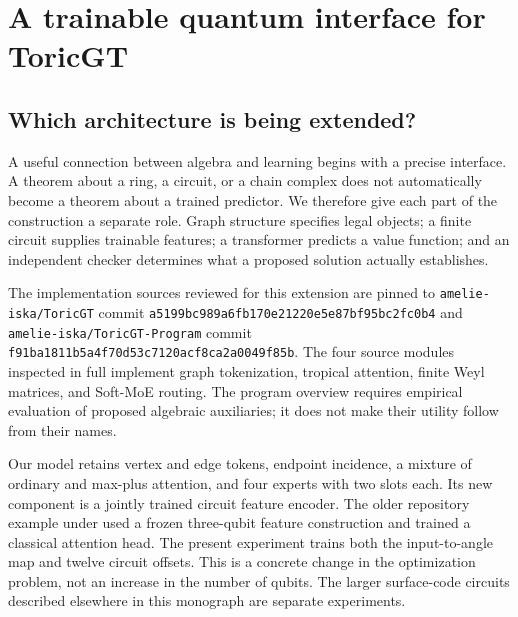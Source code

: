 \chapter{A trainable quantum interface for ToricGT}
\label{chap:quantum-toricgt}


\section{Which architecture is being extended?}

A useful connection between algebra and learning begins with a precise
interface. A theorem about a ring, a circuit, or a chain complex does not
automatically become a theorem about a trained predictor. We therefore give
each part of the construction a separate role. Graph structure specifies
legal objects; a finite circuit supplies trainable features; a transformer
predicts a value function; and an independent checker determines what a
proposed solution actually establishes.

The implementation sources reviewed for this extension are pinned to
\texttt{amelie-iska/ToricGT} commit
\texttt{a5199bc989a6fb170e21220e5e87bf95bc2fc0b4} and
\texttt{amelie-iska/ToricGT-Program} commit
\texttt{f91ba1811b5a4f70d53c7120acf8ca2a0049f85b}.
The four source modules inspected in full implement graph tokenization,
tropical attention, finite Weyl matrices, and Soft-MoE routing. The program
overview requires empirical evaluation of proposed algebraic auxiliaries;
it does not make their utility follow from their names.
\cite{qtToricGTCode,qtToricGTProgram}

Our model retains vertex and edge tokens, endpoint incidence, a mixture of
ordinary and max-plus attention, and four experts with two slots each.
Its new component is a jointly trained circuit feature encoder. The older
repository example under  used a frozen
three-qubit feature construction and trained a classical attention head.
The present experiment trains both the input-to-angle map and twelve circuit
offsets. This is a concrete change in the optimization problem, not an
increase in the number of qubits. The larger surface-code circuits described
elsewhere in this monograph are separate experiments.

